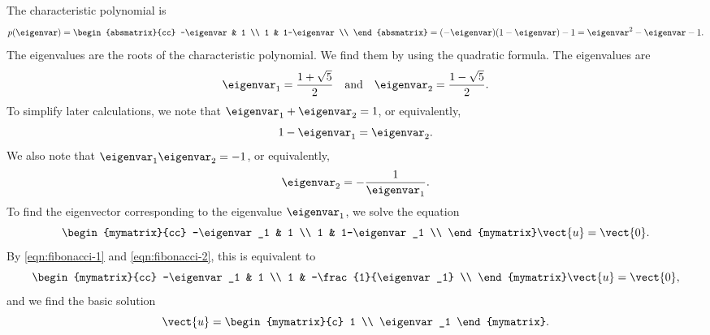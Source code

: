 \begin{solution}
  The characteristic polynomial is
  \begin{equation*}
    p(\eigenvar) =
    \begin{absmatrix}{cc}
      -\eigenvar & 1 \\
      1 & 1-\eigenvar \\
    \end{absmatrix}
    = (-\eigenvar)(1-\eigenvar) - 1
    = \eigenvar^2 - \eigenvar - 1.
  \end{equation*}
  The eigenvalues are the roots of the characteristic polynomial. We
  find them by using the quadratic formula. The eigenvalues are
  \begin{equation*}
    \eigenvar_1 = \frac{1+\sqrt{5}}{2}
    \quad\mbox{and}\quad
    \eigenvar_2 = \frac{1-\sqrt{5}}{2}.
  \end{equation*}
  To simplify later calculations, we note that
  $\eigenvar_1+\eigenvar_2 = 1$, or equivalently,
  \begin{equation}\label{eqn:fibonacci-1}
    1-\eigenvar_1 = \eigenvar_2.
  \end{equation}
  We also note that
  $\eigenvar_1\eigenvar_2 = -1$, or equivalently,
  \begin{equation}\label{eqn:fibonacci-2}
    \eigenvar_2 = -\frac{1}{\eigenvar_1}.
  \end{equation}
  To find the eigenvector corresponding to the eigenvalue $\eigenvar_1$,
  we solve the equation
  \begin{equation*}
    \begin{mymatrix}{cc}
      -\eigenvar_1 & 1 \\
      1 & 1-\eigenvar_1 \\
    \end{mymatrix}
    \vect{u} = \vect{0}.
  \end{equation*}
  By {\eqref{eqn:fibonacci-1}} and {\eqref{eqn:fibonacci-2}}, this is
  equivalent to
  \begin{equation*}
    \begin{mymatrix}{cc}
      -\eigenvar_1 & 1 \\
      1 & -\frac{1}{\eigenvar_1} \\
    \end{mymatrix}
    \vect{u} = \vect{0},
  \end{equation*}
  and we find the basic solution
  \begin{equation*}
    \vect{u} = \begin{mymatrix}{c} 1 \\ \eigenvar_1 \end{mymatrix}.

\end{equation*}
\end{solution}
